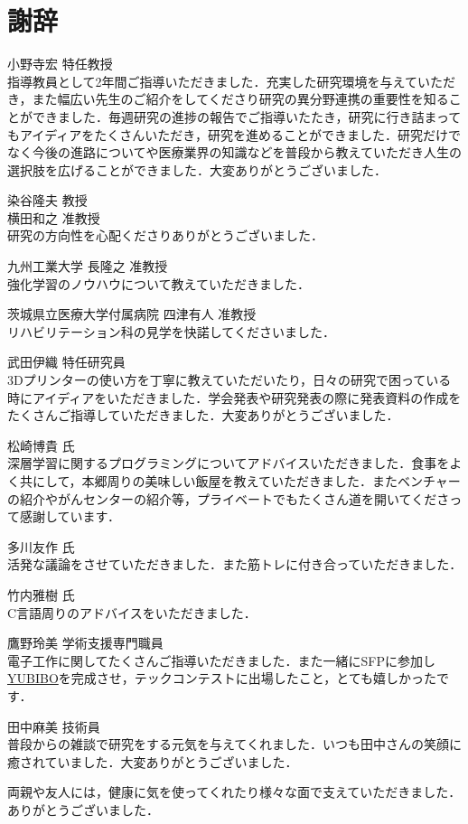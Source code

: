 \chapter*{謝辞}%
%

小野寺宏 特任教授\\
指導教員として2年間ご指導いただきました．充実した研究環境を与えていただき，また幅広い先生のご紹介をしてくださり研究の異分野連携の重要性を知ることができました．毎週研究の進捗の報告でご指導いたたき，研究に行き詰まってもアイディアをたくさんいただき，研究を進めることができました．研究だけでなく今後の進路についてや医療業界の知識などを普段から教えていただき人生の選択肢を広げることができました．大変ありがとうございました．

染谷隆夫 教授\\

横田和之 准教授\\
研究の方向性を心配くださりありがとうございました．

九州工業大学 長隆之 准教授\\
強化学習のノウハウについて教えていただきました．

茨城県立医療大学付属病院 四津有人 准教授\\
リハビリテーション科の見学を快諾してくださいました．

武田伊織 特任研究員\\
3Dプリンターの使い方を丁寧に教えていただいたり，日々の研究で困っている時にアイディアをいただきました．学会発表や研究発表の際に発表資料の作成をたくさんご指導していただきました．大変ありがとうございました．

松崎博貴 氏\\
深層学習に関するプログラミングについてアドバイスいただきました．食事をよく共にして，本郷周りの美味しい飯屋を教えていただきました．またベンチャーの紹介やがんセンターの紹介等，プライベートでもたくさん道を開いてくださって感謝しています．

多川友作 氏\\
活発な議論をさせていただきました．また筋トレに付き合っていただきました．

竹内雅樹 氏\\
C言語周りのアドバイスをいただきました．

鷹野玲美 学術支援専門職員\\
電子工作に関してたくさんご指導いただきました．また一緒にSFPに参加し\href{https://qiita.com/yumion/items/b7fa89f29504cab1f123}{YUBIBO}を完成させ，テックコンテストに出場したこと，とても嬉しかったです．

田中麻美 技術員\\
普段からの雑談で研究をする元気を与えてくれました．いつも田中さんの笑顔に癒されていました．大変ありがとうございました．

\vspace{12pt}
両親や友人には，健康に気を使ってくれたり様々な面で支えていただきました．ありがとうございました．
